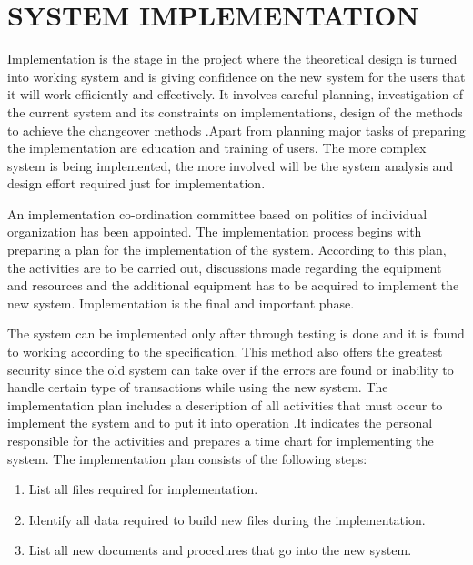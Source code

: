 \documentclass[a4paper,12pt]{article}
\begin{document}
\section{SYSTEM IMPLEMENTATION}\vspace{5mm}
Implementation is the stage in the project where the theoretical design is turned into working system and is giving confidence on the new system for the users that it will work efficiently and effectively. It involves careful planning, investigation of the current system and its constraints on implementations, design of the methods to achieve the changeover methods .Apart from planning major tasks of preparing the implementation are education and training of users. The more complex system is being implemented, the more involved will be the system analysis and design effort required just for implementation.\par\vspace{2mm}
An implementation co-ordination committee based on politics of individual organization has been appointed. The implementation process begins with preparing a plan for the implementation of the system. According to this plan, the activities are to be carried out, discussions made regarding the equipment and resources and the additional equipment has to be acquired to implement the new system. Implementation is the final and important phase.
\par\vspace{2mm}
 The system can be implemented only after through testing is done and it is found to working according to the specification. This method also offers the greatest security since the old system can take over if the errors are found or inability to handle certain type of transactions while using the new system.
  The implementation plan includes a description of all activities that must occur to implement the system and to put it into operation .It indicates the personal responsible for the activities and prepares a time chart for implementing the system. The implementation plan consists of the following steps:
\begin{enumerate}
\item List all files required for implementation.
\item Identify all data required to build new files during the implementation.
\item List all new documents and procedures that go into the new system.
\end{enumerate}
\newpage
\end{document}
